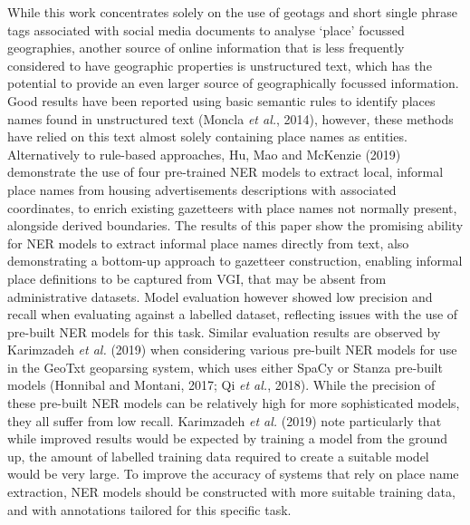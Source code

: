 \documentclass[
  letterpaper,
  11pt,
  english,
  onehalfspacing,
  headsepline]{MastersDoctoralThesis}
\begin{document}
While this work concentrates solely on the use of geotags and short
single phrase tags associated with social media documents to analyse
`place' focussed geographies, another source of online information that
is less frequently considered to have geographic properties is
unstructured text, which has the potential to provide an even larger
source of geographically focussed information. Good results have been
reported using basic semantic rules to identify places names found in
unstructured text (Moncla \emph{et al.}, 2014), however, these methods
have relied on this text almost solely containing place names as
entities. Alternatively to rule-based approaches, Hu, Mao and McKenzie
(2019) demonstrate the use of four pre-trained NER models to extract
local, informal place names from housing advertisements descriptions
with associated coordinates, to enrich existing gazetteers with place
names not normally present, alongside derived boundaries. The results of
this paper show the promising ability for NER models to extract informal
place names directly from text, also demonstrating a bottom-up approach
to gazetteer construction, enabling informal place definitions to be
captured from VGI, that may be absent from administrative datasets.
Model evaluation however showed low precision and recall when evaluating
against a labelled dataset, reflecting issues with the use of pre-built
NER models for this task. Similar evaluation results are observed by
Karimzadeh \emph{et al.} (2019) when considering various pre-built NER
models for use in the GeoTxt geoparsing system, which uses either SpaCy
or Stanza pre-built models (Honnibal and Montani, 2017; Qi \emph{et
al.}, 2018). While the precision of these pre-built NER models can be
relatively high for more sophisticated models, they all suffer from low
recall. Karimzadeh \emph{et al.} (2019) note particularly that while
improved results would be expected by training a model from the ground
up, the amount of labelled training data required to create a suitable
model would be very large. To improve the accuracy of systems that rely
on place name extraction, NER models should be constructed with more
suitable training data, and with annotations tailored for this specific
task.
\end{document}
